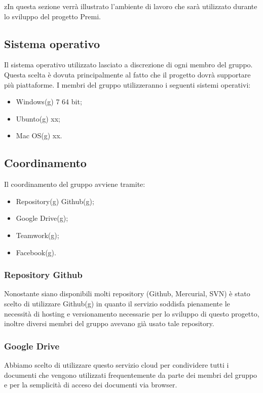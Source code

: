 zIn questa sezione verrà illustrato l'ambiente di lavoro che sarà utilizzato durante lo sviluppo del progetto Premi.\\

\subsection{Sistema operativo}

Il sistema operativo utilizzato lasciato a discrezione di ogni membro del gruppo. Questa scelta è dovuta principalmente al fatto che il progetto dovrà supportare più piattaforme.
I membri del gruppo utilizzeranno i seguenti sistemi operativi:

\begin{itemize}
	\item Windows(g) 7 64 bit;
	\item Ubunto(g) xx;
	\item Mac OS(g) xx.
\end{itemize}

\subsection{Coordinamento}

Il coordinamento del gruppo avviene tramite:
\begin{itemize}
	\item Repository(g) Github(g);
	\item Google Drive(g);
	\item Teamwork(g);
	\item Facebook(g).
\end{itemize}

\subsubsection{Repository Github}

Nonostante siano disponibili molti repository (Github, Mercurial, SVN) è stato scelto di utilizzare Github(g) in quanto il servizio soddisfa pienamente le necessità di hosting e versionamento necessarie per lo sviluppo di questo progetto, inoltre diversi membri del gruppo avevano già usato tale repository.

\subsubsection{Google Drive}

Abbiamo scelto di utilizzare questo servizio cloud per condividere tutti i documenti che vengono utilizzati frequentemente da parte dei membri del gruppo e per la semplicità di acceso dei documenti via browser.

